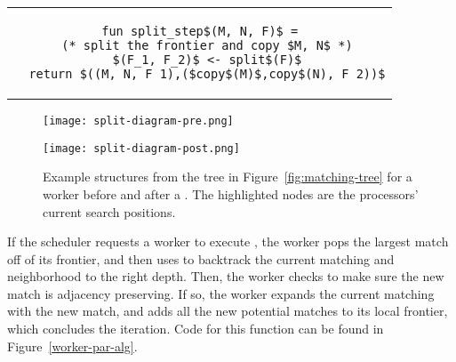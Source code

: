 %
\begin{tabular}{c}
\begin{lstlisting}
fun split_step$(M, N, F)$ =
  (* split the frontier and copy $M, N$ *)
  $(F_1, F_2)$ <- split$(F)$
  return $((M, N, F_1),($copy$(M)$,copy$(N), F_2))$
\end{lstlisting}
\end{tabular}

\begin{figure}
\centering
  \begin{minipage}[c]{\textwidth}
    \texttt{[image: split-diagram-pre.png]}
  \end{minipage}
  \begin{minipage}[c]{\textwidth}
    \texttt{[image: split-diagram-post.png]}
  \end{minipage}
  \caption{Example structures from the tree in Figure~\ref{fig:matching-tree}
    for a worker before and after a .
    The highlighted nodes are the processors' current search positions.}
  \label{fig:split-step}
\end{figure}

If the scheduler requests a worker to
execute , the worker
pops the largest match off of its frontier,
and then uses  to backtrack the
current matching and neighborhood to the right depth.
%
Then, the worker checks to make sure the new match
is adjacency preserving.
%
If so, the worker expands the current matching with
the new match, and adds all the new potential matches
to its local frontier, which concludes the iteration.
%
Code for this function can be found in Figure~\ref{worker-par-alg}.

